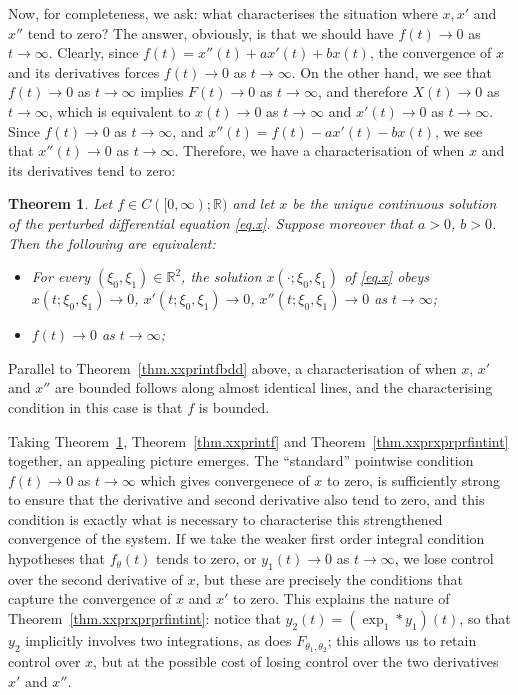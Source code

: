 \documentclass[10pt,reqno]{amsart}
\newtheorem{theorem}{Theorem}
\theoremstyle{definition}
\begin{document}
	Now, for completeness, we ask: what characterises the situation where $x, x'$ and $x''$ tend to zero? The answer, obviously, is that we should have $f(t)\to 0$ as $t\to\infty$. Clearly, since $f(t)=x''(t)+ax'(t)+bx(t)$, the convergence of $x$ and its derivatives forces $f(t)\to 0$ as $t\to\infty$. On the other hand, we see that $f(t)\to 0$ as $t\to\infty$ implies $F(t)\to 0$ as $t\to\infty$, and therefore $X(t)\to 0$ as $t\to\infty$, which is equivalent to $x(t)\to 0$ as $t\to\infty$ and $x'(t)\to 0$ as $t\to\infty$. Since $f(t)\to 0$ as $t\to\infty$, and $x''(t)=f(t)-ax'(t)-bx(t)$, we see that $x''(t)\to 0$ as $t\to\infty$. Therefore, we have a characterisation of when $x$ and its derivatives tend to zero:
	\begin{theorem} \label{thm.xf} 
		Let $f\in C([0,\infty);\mathbb{R})$ and let $x$ be the unique continuous solution of the perturbed differential equation \eqref{eq.x}. Suppose moreover that $a>0$, $b>0$. Then the following are equivalent:
		\begin{itemize}
			\item[(i)] For every $(\xi_0,\xi_1)\in \mathbb{R}^2$, the solution $x(\cdot;\xi_0,\xi_1)$ of \eqref{eq.x} obeys $x(t;\xi_0,\xi_1)\to 0$, $x'(t;\xi_0,\xi_1)\to 0$, $x''(t;\xi_0,\xi_1)\to 0$ as $t\to\infty$;
			\item[(ii)] $f(t)\to 0$ as $t\to\infty$; 
		\end{itemize}
	\end{theorem} 
	Parallel to Theorem~\ref{thm.xxprintfbdd} above, a characterisation of when $x$, $x'$ and $x''$ are bounded follows along almost identical lines, and the characterising condition in this case is that $f$ is bounded.
	
	Taking Theorem~\ref{thm.xf}, Theorem~\ref{thm.xxprintf} and Theorem~\ref{thm.xxprxprprfintint} together, an appealing picture emerges. The ``standard'' pointwise condition $f(t)\to 0$ as $t\to\infty$ which gives  convergenece of $x$ to zero, is sufficiently strong to ensure that the derivative and second derivative also tend to zero, and this condition is exactly what is necessary to  characterise this strengthened convergence of the system. If we take the weaker first order integral condition hypotheses that $f_\theta(t)$ tends to zero, or $y_1(t)\to 0$ as $t\to\infty$, we lose control over the second derivative of $x$, but these are precisely the conditions that capture the convergence of $x$ and $x'$ to zero. 
	This explains the nature of Theorem~\ref{thm.xxprxprprfintint}: notice that $y_2(t)=(\exp_1\ast y_1)(t)$, so that $y_2$ implicitly involves two integrations, as does $F_{\theta_1,\theta_2}$; this allows us to retain control over $x$, but at the possible cost of losing control over the two derivatives $x'$ and $x''$.  
	
\end{document}

